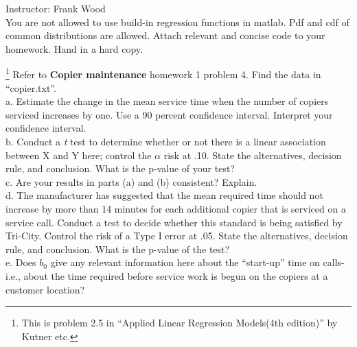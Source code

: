 \documentclass[12pt]{article}
\begin{document}
 \begin{center}
  Instructor: Frank Wood\\
 You are not allowed to use build-in regression functions in matlab. Pdf and cdf of common distributions are allowed. Attach relevant and concise code to your homework. Hand in a hard copy.
 \end{center}
{}
\finishfirstpage



 {\footnote[1]{This is
problem 2.5 in ``Applied Linear Regression Models(4th edition)'' by
Kutner etc.} 
 Refer to \textbf{Copier maintenance} homework 1 problem 4. Find the data in ``copier.txt''.\\
 a. Estimate the change in the mean service time when the number of copiers serviced increases by one. Use a 90 percent confidence interval. Interpret your confidence interval.\\
 b. Conduct a \textit{t} test to determine whether or not there is a linear association between X and Y here; control the $\alpha$ risk at .10. State the alternatives, decision rule, and conclusion. What is the p-value of your test?\\
 c. Are your results in parts (a) and (b) consistent? Explain.\\
 d. The manufacturer has suggested that the mean required time should not increase by more than 14 minutes for each additional copier that is serviced on a service call. Conduct a test to decide whether this standard is being satisfied by Tri-City. Control the risk of a Type I error at .05. State the alternatives, decision rule, and conclusion. What is the p-value of the test?\\
 e. Does $b_0$ give any relevant information here about the ``start-up'' time on calls-i.e., about the time required before service work is begun on the copiers at a customer location? 
   }
 { \vfill
  \answer
} { }
\end{document}
